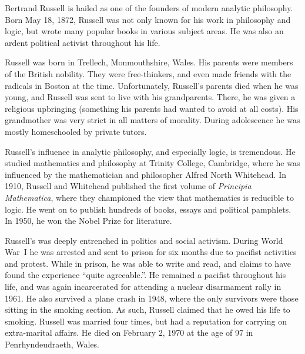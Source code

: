 \documentclass[../../../include/open-logic-section]{subfiles}
\begin{document}



Bertrand Russell is hailed as one of the founders of modern analytic
philosophy. Born May 18, 1872, Russell was not only known for his work
in philosophy and logic, but wrote many popular books in various
subject areas. He was also an ardent political activist throughout his
life.

Russell was born in Trellech, Monmouthshire, Wales. His parents were
members of the British nobility. They were free-thinkers, and even
made friends with the radicals in Boston at the time.  Unfortunately,
Russell's parents died when he was young, and Russell was sent to live
with his grandparents. There, he was given a religious upbringing
(something his parents had wanted to avoid at all costs). His
grandmother was very strict in all matters of morality. During
adolescence he was mostly homeschooled by private tutors.

Russell's influence in analytic philosophy, and especially logic, is
tremendous. He studied mathematics and philosophy at Trinity College,
Cambridge, where he was influenced by the mathematician and
philosopher Alfred North Whitehead.  In 1910, Russell and Whitehead
published the first volume of \emph{Principia Mathematica}, where they
championed the view that mathematics is reducible to logic. He went on
to publish hundreds of books, essays and political pamphlets. In 1950,
he won the Nobel Prize for literature.

Russell's was deeply entrenched in politics and social
activism. During World War~I he was arrested and sent to prison for
six months due to pacifist activities and protest. While in prison, he
was able to write and read, and claims to have found the experience
``quite agreeable.''. He remained a pacifist throughout his life, and
was again incarcerated for attending a nuclear disarmament rally in
1961. He also survived a plane crash in 1948, where the only survivors
were those sitting in the smoking section. As such, Russell claimed
that he owed his life to smoking. Russell was married four times, but
had a reputation for carrying on extra-marital affairs.  He died on
February 2, 1970 at the age of 97 in Penrhyndeudraeth, Wales.
\end{document}
